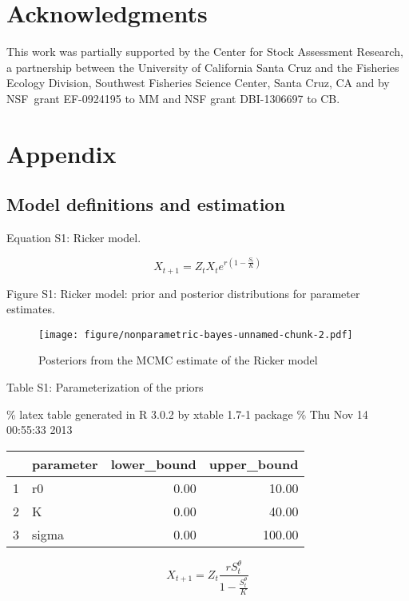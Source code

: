 \documentclass[author-year, review]{elsarticle} %
\makeatletter
\def\maxwidth{\ifdim\Gin@nat@width>\linewidth\linewidth
\else\Gin@nat@width\fi}
\let\Oldincludegraphics\includegraphics
\renewcommand{\includegraphics}[1]{\Oldincludegraphics[width=\maxwidth]{#1}}
\makeatother
\begin{document}
\section{Acknowledgments}\label{acknowledgments}

This work was partially supported by the Center for Stock Assessment
Research, a partnership between the University of California Santa Cruz
and the Fisheries Ecology Division, Southwest Fisheries Science Center,
Santa Cruz, CA and by NSF~grant EF-0924195 to MM and NSF grant
DBI-1306697 to CB.

\section{Appendix}\label{appendix}

\subsection{Model definitions and
estimation}\label{model-definitions-and-estimation}

Equation S1: Ricker model.

\[X_{t+1} = Z_t X_t e^{r \left(1 - \frac{S_t}{K} \right) } \]

Figure S1: Ricker model: prior and posterior distributions for parameter
estimates.

\begin{figure}[htbp]
\centering
\texttt{[image: figure/nonparametric-bayes-unnamed-chunk-2.pdf]}
\caption{Posteriors from the MCMC estimate of the Ricker model}
\end{figure}

Table S1: Parameterization of the priors

\% latex table generated in R 3.0.2 by xtable 1.7-1 package \% Thu Nov
14 00:55:33 2013

\begin{table}[ht]
\centering
\begin{tabular}{rlrr}
  \hline
 & parameter & lower\_bound & upper\_bound \\ 
  \hline
1 & r0 & 0.00 & 10.00 \\ 
  2 & K & 0.00 & 40.00 \\ 
  3 & sigma & 0.00 & 100.00 \\ 
   \hline
\end{tabular}
\end{table}

\[ X_{t+1} = Z_t \frac{r S_t^{\theta}}{1 - \frac{S_t^\theta}{K}} \]
\end{document}
